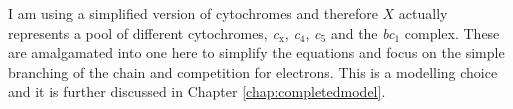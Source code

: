 I am using a simplified version of cytochromes and therefore $X$ actually represents a pool of different cytochromes, \textit{c$_{\textrm{x}}$}, \textit{c$_{\textrm{4}}$}, \textit{c$_{\textrm{5}}$} and the \textit{bc$_{\textrm{1}}$} complex. These are amalgamated into one here to simplify the equations and focus on the simple branching of the chain and competition for electrons. This is a modelling choice and it is further discussed in Chapter \ref{chap:completedmodel}.


